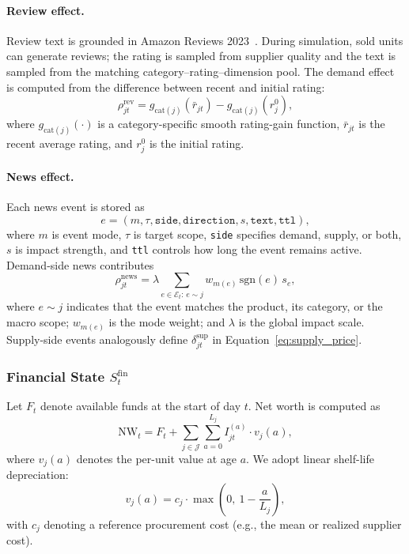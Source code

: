\paragraph{Review effect.}
Review text is grounded in Amazon Reviews 2023~\citep{hou2024bridging}. During simulation, sold units can generate reviews; the rating is sampled from supplier quality and the text is sampled from the matching category--rating--dimension pool. The demand effect is computed from the difference between recent and initial rating:
\begin{equation}
\rho^{\mathrm{rev}}_{jt}
=g_{\mathrm{cat}(j)}(\bar r_{jt})-g_{\mathrm{cat}(j)}(r^{0}_{j}),
\label{eq:review_effect}
\end{equation}
where $g_{\mathrm{cat}(j)}(\cdot)$ is a category-specific smooth rating-gain function, $\bar r_{jt}$ is the recent average rating, and $r^{0}_{j}$ is the initial rating.

\paragraph{News effect.}
Each news event is stored as
\begin{equation}
e=(m,\tau,\texttt{side},\texttt{direction},s,\texttt{text},\texttt{ttl}),
\label{eq:news_record}
\end{equation}
where $m$ is event mode, $\tau$ is target scope, \texttt{side} specifies demand, supply, or both, $s$ is impact strength, and \texttt{ttl} controls how long the event remains active. Demand-side news contributes
\begin{equation}
\rho^{\mathrm{news}}_{jt}
=\lambda\sum_{e\in\mathcal{E}_t:\,e\sim j}
w_{m(e)}\,\mathrm{sgn}(e)\,s_e,
\label{eq:news_effect}
\end{equation}
where $e\sim j$ indicates that the event matches the product, its category, or the macro scope; $w_{m(e)}$ is the mode weight; and $\lambda$ is the global impact scale. Supply-side events analogously define $\delta^{\mathrm{sup}}_{jt}$ in Equation~\ref{eq:supply_price}.

\subsubsection{Financial State \texorpdfstring{$S_t^{\text{fin}}$}{S t fin}}

Let $F_t$ denote available funds at the start of day $t$. Net worth is computed as
\begin{equation}
\mathrm{NW}_t = F_t + \sum_{j\in\mathcal{J}} \sum_{a=0}^{L_j} I_{jt}^{(a)} \cdot v_j(a),
\end{equation}
where $v_j(a)$ denotes the per-unit value at age $a$. We adopt linear shelf-life depreciation:
\begin{equation}
v_j(a) = c_j \cdot \max\!\left(0,\ 1 - \frac{a}{L_j}\right),
\end{equation}
with $c_j$ denoting a reference procurement cost (e.g., the mean or realized supplier cost).

